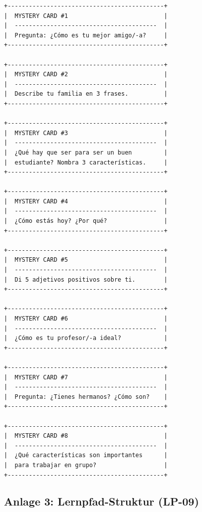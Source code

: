 \documentclass[11pt,a4paper]{article}
\begin{document}
\begin{verbatim}
+--------------------------------------------+
|  MYSTERY CARD #1                           |
|  ----------------------------------------  |
|  Pregunta: ¿Cómo es tu mejor amigo/-a?     |
+--------------------------------------------+

+--------------------------------------------+
|  MYSTERY CARD #2                           |
|  ----------------------------------------  |
|  Describe tu familia en 3 frases.          |
+--------------------------------------------+

+--------------------------------------------+
|  MYSTERY CARD #3                           |
|  ----------------------------------------  |
|  ¿Qué hay que ser para ser un buen         |
|  estudiante? Nombra 3 características.     |
+--------------------------------------------+

+--------------------------------------------+
|  MYSTERY CARD #4                           |
|  ----------------------------------------  |
|  ¿Cómo estás hoy? ¿Por qué?                |
+--------------------------------------------+

+--------------------------------------------+
|  MYSTERY CARD #5                           |
|  ----------------------------------------  |
|  Di 5 adjetivos positivos sobre ti.        |
+--------------------------------------------+

+--------------------------------------------+
|  MYSTERY CARD #6                           |
|  ----------------------------------------  |
|  ¿Cómo es tu profesor/-a ideal?            |
+--------------------------------------------+

+--------------------------------------------+
|  MYSTERY CARD #7                           |
|  ----------------------------------------  |
|  Pregunta: ¿Tienes hermanos? ¿Cómo son?    |
+--------------------------------------------+

+--------------------------------------------+
|  MYSTERY CARD #8                           |
|  ----------------------------------------  |
|  ¿Qué características son importantes      |
|  para trabajar en grupo?                   |
+--------------------------------------------+
\end{verbatim}

\subsection{Anlage 3: Lernpfad-Struktur (LP-09)}
\end{document}
